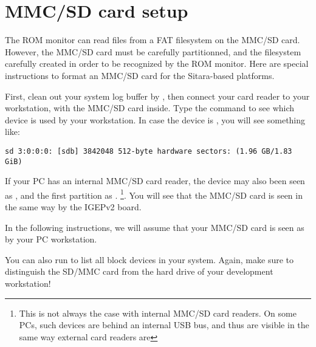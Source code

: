 \section{MMC/SD card setup}

The ROM monitor can read files from a FAT filesystem on the MMC/SD
card. However, the MMC/SD card must be carefully partitionned, and the
filesystem carefully created in order to be recognized by the ROM
monitor. Here are special instructions to format an MMC/SD card
for the Sitara-based platforms.

First, clean out your system log buffer by , then
connect your card reader to your workstation, with the MMC/SD
card inside. Type the  command to see which device is used
by your workstation. In case the device is , you will see
something like:

\begin{verbatim}
sd 3:0:0:0: [sdb] 3842048 512-byte hardware sectors: (1.96 GB/1.83 GiB)
\end{verbatim}

If your PC has an internal MMC/SD card reader, the device may also been
seen as , and the first partition as
. \footnote{This is not always the case with internal
MMC/SD card readers. On some PCs, such devices are behind an internal
USB bus, and thus are visible in the same way external card readers
are}. You will see that the MMC/SD card is seen in the same
way by the IGEPv2 board.

In the following instructions, we will assume that your MMC/SD card
is seen as  by your PC workstation.


You can also run  to list all block devices
in your system. Again, make sure to distinguish the SD/MMC card from the
hard drive of your development workstation!


